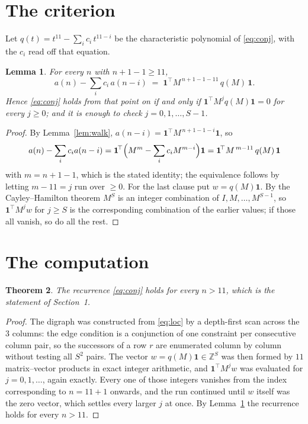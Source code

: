 \documentclass[11pt,a4paper]{article}
\theoremstyle{plain}
\newtheorem{theorem}{Theorem}
\newtheorem{lemma}[theorem]{Lemma}
\theoremstyle{definition}
\begin{document}
\section{The criterion}

Let $q(t)=t^{11}-\sum_i c_i\,t^{11-i}$ be the characteristic polynomial of
\eqref{eq:conj}, with the $c_i$ read off that equation.

\begin{lemma}\label{lem:crit}
For every $n$ with $n+1-1\ge11$,
\[
a(n)-\sum_i c_i\,a(n-i)\;=\;\mathbf{1}^{\!\top}M^{\,n+1-1-11}\,q(M)\,\mathbf{1} .
\]
Hence \eqref{eq:conj} holds from that point on if and only if
$\mathbf{1}^{\!\top}M^{j}q(M)\mathbf{1}=0$ for every $j\ge0$; and it is enough to check
$j=0,1,\dots,S-1$.
\end{lemma}

\begin{proof}
By Lemma~\ref{lem:walk}, $a(n-i)=\mathbf{1}^{\!\top}M^{\,n+1-1-i}\mathbf{1}$, so
\[
a(n)-\sum_i c_i a(n-i)
=\mathbf{1}^{\!\top}\Bigl(M^{m}-\sum_i c_i M^{m-i}\Bigr)\mathbf{1}
=\mathbf{1}^{\!\top}M^{\,m-11}\,q(M)\,\mathbf{1}
\]
with $m=n+1-1$, which is the stated identity; the equivalence follows by letting
$m-11=j$ run over $\ge0$. For the last clause put $w=q(M)\mathbf{1}$. By the
Cayley--Hamilton theorem $M^{S}$ is an integer combination of $I,M,\dots,M^{S-1}$, so
$\mathbf{1}^{\!\top}M^{j}w$ for $j\ge S$ is the corresponding combination of the earlier
values; if those all vanish, so do all the rest.
\end{proof}

\section{The computation}

\begin{theorem}
The recurrence \eqref{eq:conj} holds for every $n>11$, which is the statement of
Section~1.
\end{theorem}

\begin{proof}
The digraph was constructed from \eqref{eq:loc} by a depth-first scan across the $3$
columns: the edge condition is a conjunction of one constraint per consecutive column
pair, so the successors of a row $r$ are enumerated column by column without testing all
$S^2$ pairs. The vector $w=q(M)\mathbf{1}\in\mathbb{Z}^{S}$ was then formed by $11$
matrix--vector products in exact integer arithmetic, and $\mathbf{1}^{\!\top}M^{j}w$ was
evaluated for $j=0,1,\dots$, again exactly. Every one of those integers vanishes from the
index corresponding to $n=11+1$ onwards, and the run continued until $w$ itself was the
zero vector, which settles every larger $j$ at once. By Lemma~\ref{lem:crit} the recurrence
holds for every $n>11$.
\end{proof}
\end{document}
